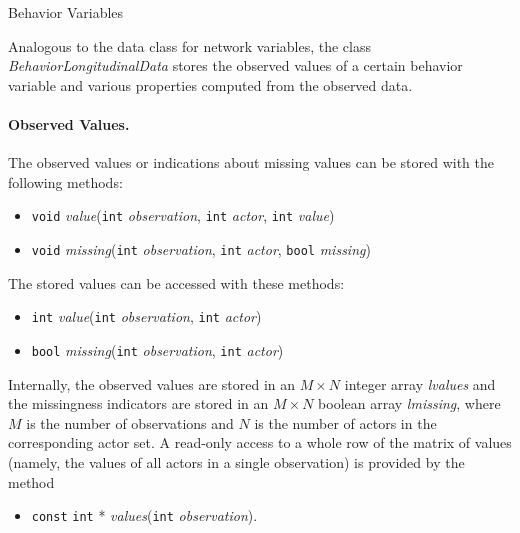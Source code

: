 \documentclass[12pt]{article}
\makeatletter
\renewcommand{\=}{\,=\,}
\newcommand{\+}{\,+\,}
\newcommand{\nnm}[1]{\textsf{\small\textit{#1}}}
\renewcommand{\subsubsection}{\@startsection{subsubsection}{3}
                {0pt}{0.7\baselineskip}{0.3\baselineskip}
                {\sffamily} }
\makeatother
\begin{document}
\subsubsection{Behavior Variables}

Analogous to the data class for network variables, the class
\nnm{BehaviorLongitudinalData} stores the observed values of a certain behavior
variable and various properties computed from the observed data.

\paragraph{Observed Values.}
The observed values or indications about missing values can be stored with the
following methods:
\begin{itemize}
\item \verb|void| \nnm{value}(\verb|int| \nnm{observation},
\verb|int| \nnm{actor}, \verb|int| \nnm{value})
\item \verb|void| \nnm{missing}(\verb|int| \nnm{observation},
\verb|int| \nnm{actor}, \verb|bool| \nnm{missing})
\end{itemize}

The stored values can be accessed with these methods:
\begin{itemize}
\item \verb|int| \nnm{value}(\verb|int| \nnm{observation},
\verb|int| \nnm{actor})
\item \verb|bool| \nnm{missing}(\verb|int| \nnm{observation},
\verb|int| \nnm{actor})
\end{itemize}

Internally, the observed values are stored in an $M \times N$ integer array
\nnm{lvalues} and the missingness indicators are stored in an $M \times N$
boolean array \nnm{lmissing}, where $M$ is the number of observations and $N$ is
the number of actors in the corresponding actor set. A read-only access to a
whole row of the matrix of values (namely, the values of all actors in a single
observation) is provided by the method
\begin{itemize}
\item \verb|const| \verb|int| * \nnm{values}(\verb|int| \nnm{observation}).
\end{itemize}
\end{document}
